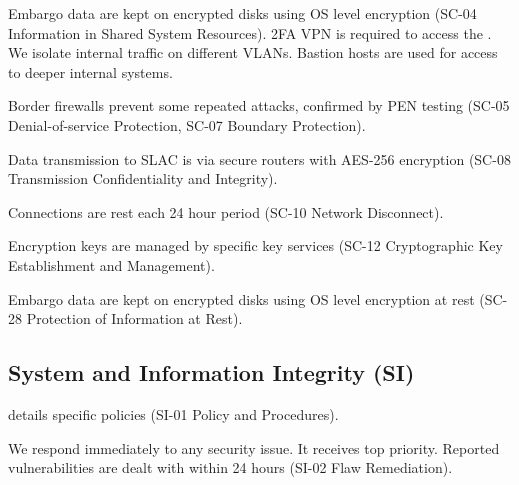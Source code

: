 Embargo data are kept on encrypted disks using OS level encryption (SC-04  Information in Shared System Resources).
2FA VPN is required to access the \PZ.
We isolate internal traffic on different VLANs.
Bastion hosts are used for access to deeper internal systems.

Border firewalls prevent some repeated attacks, confirmed by PEN testing (SC-05  Denial-of-service Protection, SC-07  Boundary Protection).

Data transmission to SLAC is via  secure routers with AES-256 encryption (SC-08  Transmission Confidentiality and Integrity).

Connections are rest each 24 hour period (SC-10  Network Disconnect).

Encryption keys are managed by specific key services  (SC-12  Cryptographic Key Establishment and Management).

Embargo data are kept on encrypted disks using OS level encryption at rest (SC-28  Protection of Information at Rest).


\subsection{ System and Information Integrity (SI)} \label{sec:SI}
 details specific policies (SI-01  Policy and Procedures).

We respond immediately to any security issue.
It receives top priority.
Reported vulnerabilities are dealt with within 24 hours (SI-02  Flaw Remediation).

